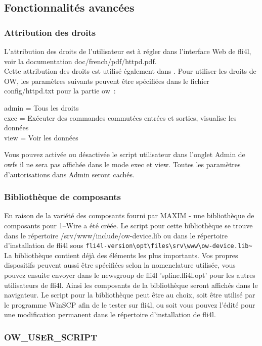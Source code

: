 \subsection{Fonctionnalités avancées}
\subsubsection{Attribution des droits}
L'attribution des droits de l'utilisateur est à régler dans l'interface Web de fli4l,
voir la documentation doc/french/pdf/httpd.pdf. \\
Cette attribution des droits est utilisé également dans . Pour utiliser
les droits de OW, les paramètres suivants peuvent être spécifiées dans le fichier config/httpd.txt
pour la partie \flqq{}ow\frqq{}~:

admin = Tous les droits \\
exec = Exécuter des commandes commutées entrées et sorties, visualise les données \\
view = Voir les données

Vous pouvez activée ou désactivée le script utilisateur dans l'onglet Admin de owfs
il ne sera pas affichée dans le mode \flqq{}exec\frqq{} et \flqq{}view\frqq{}.
Toutes les paramètres d'autorisations dans \flqq{}Admin\frqq{} seront cachés.

\subsubsection{Bibliothèque de composants}
En raison de la variété des composants fourni par MAXIM - une bibliothèque de composants
pour 1--Wire a été créée. Le script pour cette bibliothèque se trouve dans le répertoire
/srv/www/include/ow-device.lib ou dans le répertoire d'installation de fli4l sous
\verb!fli4l-version\opt\files\srv\www\ow-device.lib~! La bibliothèque contient déjà
des éléments les plus importants. Vos propres dispositifs peuvent aussi être spécifiées
selon la nomenclature utilisée, vous pouvez ensuite envoyer dans le newsgroup de fli4l
'spline.fli4l.opt' pour les autres utilisateurs de fli4l. Ainsi les composants de la bibliothèque
seront affichés dans le navigateur. Le script pour la bibliothèque peut être au choix, soit
être utilisé par le programme \flqq{}WinSCP\frqq{} afin de le tester sur fli4l, ou soit vous
pouvez l'édité pour une modification permanent dans le répertoire d'installation de fli4l.

{
\subsubsection{OW\_USER\_SCRIPT}
}

